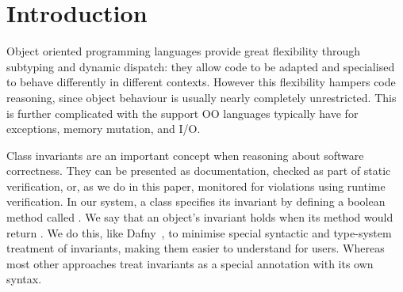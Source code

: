 \section{Introduction}
\label{s:intro}

Object oriented programming languages provide great flexibility through subtyping and dynamic dispatch: they
allow code to be adapted and specialised to behave differently in different contexts.
However this flexibility hampers code reasoning, since object behaviour is usually nearly completely
unrestricted. This is further complicated with the support OO languages typically have for exceptions,
memory mutation, and I/O.


Class invariants are an important concept when reasoning about software correctness.
They can be presented as documentation, checked as part of static verification, or, as we do in this paper, monitored for violations using runtime verification.
In our system, a class specifies its invariant by defining a boolean method called \Q@invariant@.
We say that an object's invariant holds when its \Q@invariant@ method would return \Q@true@. 
We do this, like Dafny~\cite{DBLP:conf/sigada/Leino12}, to minimise special syntactic and type-system treatment of invariants, making them easier to understand for users. Whereas most other approaches treat invariants as a special annotation with its own syntax.

